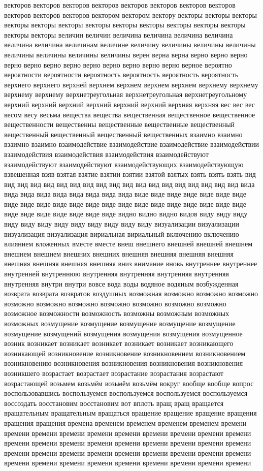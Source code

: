 векторов векторов векторов векторов векторов векторов векторов векторов векторов векторов векторов вектором вектором вектору векторы векторы векторы векторы векторы векторы векторы векторы векторы векторы векторы векторы векторы векторы величин величин величина величина величина величина величина величина величинам величине величину величины величины величины величины величины величины величины верен верна верна верно верно верно верно верно верно верно верно верно верно верно верно верное вероятно вероятности вероятности вероятность вероятность вероятность вероятность верхнего верхнего верхней верхнем верхнем верхнем верхнем верхнему верхнему верхнему верхнему верхнетреугольная верхнетреугольная верхнетреугольному верхний верхний верхний верхний верхний верхний верхняя верхняя вес вес вес весом весу весьма вещества вещества вещественная вещественное вещественное вещественности вещественны вещественные вещественные вещественный вещественный вещественный вещественный вещественных взаимно взаимно взаимно взаимно взаимодействие взаимодействие взаимодействие взаимодействии взаимодействия взаимодействия взаимодействия взаимодействуют взаимодействуют взаимодействуют взаимодействующих взаимодействующую взвешенная взяв взятая взятие взятии взятии взятой взятых взять взять взять вид вид вид вид вид вид вид вид вид вид вид вид вид вид вид вид вид вид вид вида вида вида вида вида вида вида вида вида виде виде виде виде виде виде виде виде виде виде виде виде виде виде виде виде виде виде виде виде виде виде виде виде виде виде виде виде виде видно видно видно видов виду виду виду виду виду виду виду виду виду виду виду виду визуализации визуализации визуализация визуализация вириальная вириальный включению включению влиянием вложенных вместе вместе внеш внешнего внешней внешней внешнем внешнем внешнем внешних внешних внешняя внешняя внешняя внешняя внешняя внешняя внешняя внешняя вниз внимание вновь внутреннее внутреннее внутренней внутреннюю внутренняя внутренняя внутренняя внутренняя внутренняя внутри внутри вовсе вода воды водяное водяным возбужденная возврата возврата возвратов воздушных возможная возможно возможно возможно возможно возможно возможно возможно возможно возможно возможно возможное возможности возможность возможны возможным возможных возможных возмущение возмущение возмущение возмущение возмущение возмущение возмущений возмущения возмущения возмущения возмущенное возник возникает возникает возникает возникает возникает возникающего возникающей возникновение возникновение возникновением возникновением возникновению возникновения возникновения возникновения возникновения возникшего возрастает возрастает возрастание возрастания возрастают возрастающей возьмем возьмём возьмём возьмём вокруг вообще вообще вопрос воспользовавшись воспользуемся воспользуемся воспользуемся воспользуемся воссоздать восстановим восстановим вот вплоть вращ вращ вращается вращательным вращательным вращаться вращение вращение вращение вращения вращения вращения времена временем временем временем временем времени времени времени времени времени времени времени времени времени времени времени времени времени времени времени времени времени времени времени времени времени времени времени времени времени времени времени времени времени времени времени времени времени времени времени времени времени 